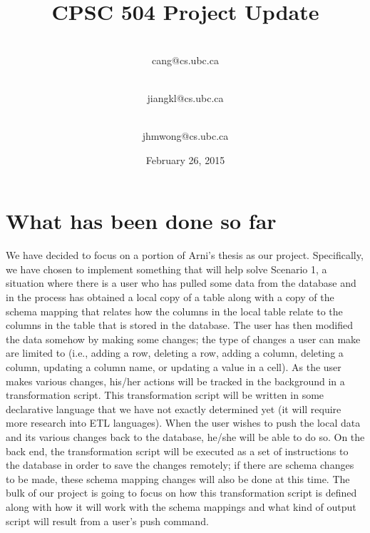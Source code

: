 \documentclass[12pt]{article}
\begin{document}
\begin{titlepage}
\title{CPSC 504 Project Update \vspace{4 cm}}
\date{\vspace{2 cm} February 26, 2015}

\author{
 \\cang@cs.ubc.ca\\
  \and {}\\jiangkl@cs.ubc.ca\\
  \and {}\\jhmwong@cs.ubc.ca\\ 
}
\maketitle
\thispagestyle{empty}
\end{titlepage}
\newpage
\section{What has been done so far}
We have decided to focus on a portion of Arni's thesis \cite{arniThesis} as our project. Specifically, we have chosen to implement something that will help solve Scenario 1, a situation where there is a user who has pulled some data from the database and in the process has obtained a local copy of a table along with a copy of the schema mapping that relates how the columns in the local table relate to the columns in the table that is stored in the database. The user has then modified the data somehow by making some changes; the type of changes a user can make are limited to (i.e., adding a row, deleting a row, adding a column, deleting a column, updating a column name, or updating a value in a cell). As the user makes various changes, his/her actions will be tracked in the background in a transformation script. This transformation script will be written in some declarative language that we have not exactly determined yet (it will require more research into ETL languages). When the user wishes to push the local data and its various changes back to the database, he/she will be able to do so. On the back end, the transformation script will be executed as a set of instructions to the database in order to save the changes remotely; if there are schema changes to be made, these schema mapping changes will also be done at this time. The bulk of our project is going to focus on how this transformation script is defined along with how it will work with the schema mappings and what kind of output script will result from a user's push command.
\end{document}
